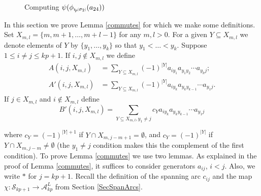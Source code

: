 \documentclass[11pt]{amsart}
\newcommand{\oarc}[4]{
\draw[thick, postaction={on each segment={mid arrow}}] (#1,#2) ..controls (#1 + .2,#2 + .7) and (#3 - .2,#4 + .7) .. (#3,#4);
}
\def\A{{\mathcal A}}
\def\s{{\sigma}}
\newcommand*{\subsmallp}[1]{\scalebox{.5}{\ensuremath#1}}
\newcommand{\subpp}[2][p]{\imath_{\hspace*{-1pt}#1}\hspace*{-.5pt}\subsmallp(#2\subsmallp)}
\theoremstyle{definition}
\begin{document}
{\begin{figure}[ht]
\caption{Computing $\psi(\phi_{\subpp{\s_2}}(a_{24}))$}
\label{FigCommutes}
\end{figure}

}%

In this section we prove Lemma \ref{commutes} for which we make some definitions.  Set $X_{m,l} = \{m,m+1,\ldots,m+l-1\}$ for any $m,l>0$. For a given $Y\subseteq X_{m,l}$ we denote elements of $Y$ by $\{y_1,\ldots,y_k\}$ so that $y_1<\ldots <y_k$.  Suppose $1\le i\ne j\le kp+1$. If $i,j\not\in X_{m,l}$ we define
\begin{align*}
   A(i,j,X_{m,l})   &= \sum_{Y\subseteq X_{m,l}}(-1)^{|Y|}a_{iy_1}a_{y_1y_2}\cdots a_{y_kj};\\
   A'(i,j,X_{m,l})  &= \sum_{Y\subseteq X_{m,l}}(-1)^{|Y|}a_{iy_k}a_{y_ky_{k-1}}\cdots a_{y_1j}.
 \end{align*}
If $j\in X_{m,l}$ and $i\not\in X_{m,l}$ define
$$
B'(i,j,X_{m,l}) = \sum_{Y\subseteq X_{m,l}, y_1\ne j}c_Ya_{iy_k}a_{y_ky_{k-1}}\cdots a_{y_1j}
$$

\noindent where $c_Y = (-1)^{|Y|+1}$ if $Y\cap X_{m,j-m+1} = \emptyset$, and $c_Y = (-1)^{|Y|}$ if $Y\cap X_{m,j-m}\ne\emptyset$ (the $y_1\ne j$ condition makes this the complement of the first condition). To prove Lemma \ref{commutes} we use two lemmas. As explained in the proof of Lemma \ref{commutes}, it suffices to consider generators $a_{ij}$, $i<j$. Also, we write $\ast$ for $j=kp+1$. Recall the definition of the spanning arc $c_{ij}$ and the map $\chi:\mathscr S_{kp+1}\to\A_{kp}^L$ from Section \ref{SecSpanArcs}.
\end{document}
